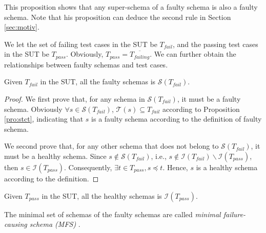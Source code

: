 This proposition shows that any super-schema of a faulty schema is also a faulty schema.  Note that his proposition can deduce the second rule in Section \ref{sec:motiv}.


We let the set of failing test cases in the SUT be $T_{fail}$, and the passing test cases in the SUT be $T_{pass}$. Obviously, $T_{pass} = \overline{T_{failing}}$. We can further obtain the relationships between faulty schemas and test cases.

\begin{proposition}\label{pro:faultyschemastests}
Given  $T_{fail}$ in the SUT, all the faulty schemas is $\mathcal{S}(T_{fail})$.
\end{proposition}

\begin{proof}
We first prove that, for any schema in $\mathcal{S}(T_{fail})$, it must be a faulty schema.
Obviously $\forall s \in \mathcal{S}(T_{fail})$, $\mathcal{T}(s) \subseteq T_{fail}$ according to Proposition \ref{pro:stct}, indicating that $s$ is a faulty schema according to the definition of faulty schema.

We second prove that, for any other schema that does not belong to $\mathcal{S}(T_{fail})$, it must be a healthy schema.
Since $s \notin \mathcal{S}(T_{fail})$, i.e., $s \notin \mathcal{I}(T_{fail}) \backslash \mathcal{I}(T_{pass})$, then $s \in \mathcal{I}(T_{pass})$. Consequently, $\exists t \in T_{pass}, s \preceq t$. Hence, $s$ is a healthy schema according to the definition.
\end{proof}

\begin{proposition}\label{pro:healthyschemastests}
Given  $T_{pass}$ in the SUT, all the healthy schemas is $\mathcal{I}(T_{pass})$.
\end{proposition}

%
%

\begin{definition} \label{de:faulty:minimal}
The minimal set of schemas of the faulty schemas are called \emph{minimal failure-causing schema (MFS)} \cite{nie2011minimal}.
\end{definition}

